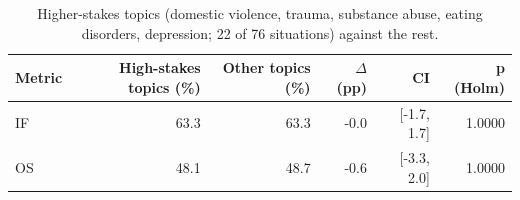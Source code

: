 \begin{table}[t]
\centering
\small
\caption{Higher-stakes topics (domestic violence, trauma, substance abuse, eating disorders, depression; 22 of 76 situations) against the rest.}
\label{tab:high_stakes}
\begin{tabular}{lrrrrr}
\toprule
Metric & High-stakes topics (\%) & Other topics (\%) & $\Delta$ (pp) & CI & p (Holm) \\
\midrule
IF & 63.3 & 63.3 & -0.0 & [-1.7, 1.7] & 1.0000 \\
OS & 48.1 & 48.7 & -0.6 & [-3.3, 2.0] & 1.0000 \\
\bottomrule
\end{tabular}
\end{table}
